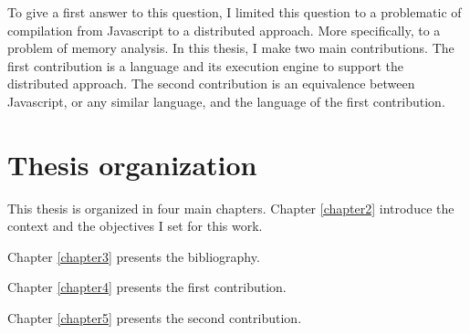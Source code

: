 To give a first answer to this question, I limited this question to a problematic of compilation from Javascript to a distributed approach.
More specifically, to a problem of memory analysis.
In this thesis, I make two main contributions.
The first contribution is a language and its execution engine to support the distributed approach.
The second contribution is an equivalence between Javascript, or any similar language, and the language of the first contribution.

\section{Thesis organization}

This thesis is organized in four main chapters.
Chapter \ref{chapter2} introduce the context and the objectives I set for this work.

Chapter \ref{chapter3} presents the bibliography.

Chapter \ref{chapter4} presents the first contribution.

Chapter \ref{chapter5} presents the second contribution.
